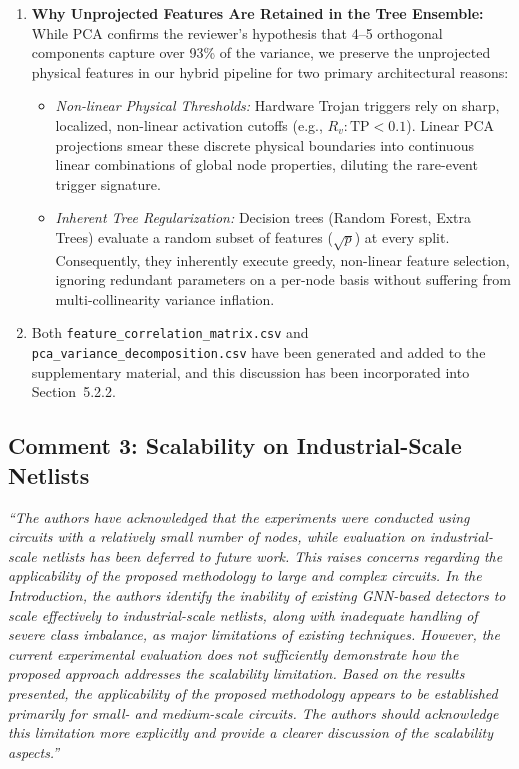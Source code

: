 \documentclass[11pt,a4paper]{article}
\newcommand{\reviewercomment}[1]{\vspace{4pt}\noindent\textcolor{revcomment}{\textit{``#1''}}\vspace{4pt}}
\begin{document}
\begin{enumerate}[leftmargin=*]
    \item \textbf{Why Unprojected Features Are Retained in the Tree Ensemble:}
    While PCA confirms the reviewer's hypothesis that 4--5 orthogonal components capture over 93\% of the variance, we preserve the unprojected physical features in our hybrid pipeline for two primary architectural reasons:
    \begin{itemize}
        \item \textit{Non-linear Physical Thresholds:} Hardware Trojan triggers rely on sharp, localized, non-linear activation cutoffs (e.g., $R_v: \text{TP} < 0.1$). Linear PCA projections smear these discrete physical boundaries into continuous linear combinations of global node properties, diluting the rare-event trigger signature.
        \item \textit{Inherent Tree Regularization:} Decision trees (Random Forest, Extra Trees) evaluate a random subset of features ($\sqrt{p}$) at every split. Consequently, they inherently execute greedy, non-linear feature selection, ignoring redundant parameters on a per-node basis without suffering from multi-collinearity variance inflation.
    \end{itemize}

    \item Both \texttt{feature\_correlation\_matrix.csv} and \texttt{pca\_variance\_decomposition.csv} have been generated and added to the supplementary material, and this discussion has been incorporated into Section~5.2.2.
\end{enumerate}

\subsection*{Comment 3: Scalability on Industrial-Scale Netlists}

\reviewercomment{The authors have acknowledged that the experiments were conducted using circuits with a relatively small number of nodes, while evaluation on industrial-scale netlists has been deferred to future work. This raises concerns regarding the applicability of the proposed methodology to large and complex circuits. In the Introduction, the authors identify the inability of existing GNN-based detectors to scale effectively to industrial-scale netlists, along with inadequate handling of severe class imbalance, as major limitations of existing techniques. However, the current experimental evaluation does not sufficiently demonstrate how the proposed approach addresses the scalability limitation. Based on the results presented, the applicability of the proposed methodology appears to be established primarily for small- and medium-scale circuits. The authors should acknowledge this limitation more explicitly and provide a clearer discussion of the scalability aspects.}
\end{document}

